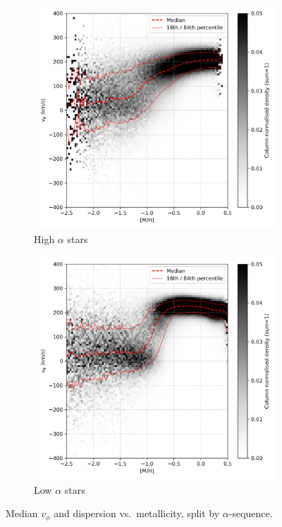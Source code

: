 \documentclass[a4paper,10pt]{article}
\begin{document}
\begin{multicols}{2}
\begin{figure}[H]
  \centering
  \begin{subfigure}[t]{0.48\linewidth}
    \includegraphics[width=\linewidth]{../figures/vis_mh_vphi_high_alpha.png}
    \caption{High $\alpha$ stars}
  \end{subfigure}
  \hfill
  \begin{subfigure}[t]{0.48\linewidth}
    \includegraphics[width=\linewidth]{../figures/vis_mh_vphi_low_alpha.png}
    \caption{Low $\alpha$ stars}
  \end{subfigure}
  \caption{Median $v_\phi$ and dispersion vs.\ metallicity, split by $\alpha$-sequence.}
  \label{fig:mh_vphi_alpha}
\end{figure}


\end{multicols}
\end{document}
